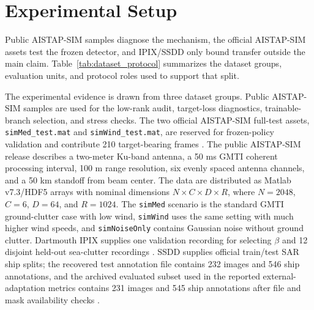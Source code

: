 \documentclass[journal]{IEEEtran}
\begin{document}
\section{Experimental Setup}

Public AISTAP-SIM samples diagnose the mechanism, the official AISTAP-SIM assets test the frozen detector, and IPIX/SSDD only bound transfer outside the main claim. Table~\ref{tab:dataset_protocol} summarizes the dataset groups, evaluation units, and protocol roles used to support that split.

The experimental evidence is drawn from three dataset groups. Public AISTAP-SIM samples are used for the low-rank audit, target-loss diagnostics, trainable-branch selection, and stress checks. The two official AISTAP-SIM full-test assets, \texttt{simMed\_test.mat} and \texttt{simWind\_test.mat}, are reserved for frozen-policy validation and contribute 210 target-bearing frames \cite{vega2024aistap}. The public AISTAP-SIM release describes a two-meter Ku-band antenna, a 50 ms GMTI coherent processing interval, 100 m range resolution, six evenly spaced antenna channels, and a 50 km standoff from beam center. The data are distributed as Matlab v7.3/HDF5 arrays with nominal dimensions $N\times C\times D\times R$, where $N=2048$, $C=6$, $D=64$, and $R=1024$. The \texttt{simMed} scenario is the standard GMTI ground-clutter case with low wind, \texttt{simWind} uses the same setting with much higher wind speeds, and \texttt{simNoiseOnly} contains Gaussian noise without ground clutter. Dartmouth IPIX supplies one validation recording for selecting $\beta$ and 12 disjoint held-out sea-clutter recordings \cite{haykin2002seaclutter,dewind2010database}. SSDD supplies official train/test SAR ship splits; the recovered test annotation file contains 232 images and 546 ship annotations, and the archived evaluated subset used in the reported external-adaptation metrics contains 231 images and 545 ship annotations after file and mask availability checks \cite{wang2019ssdd,zhang2021ssdd}.
\end{document}

